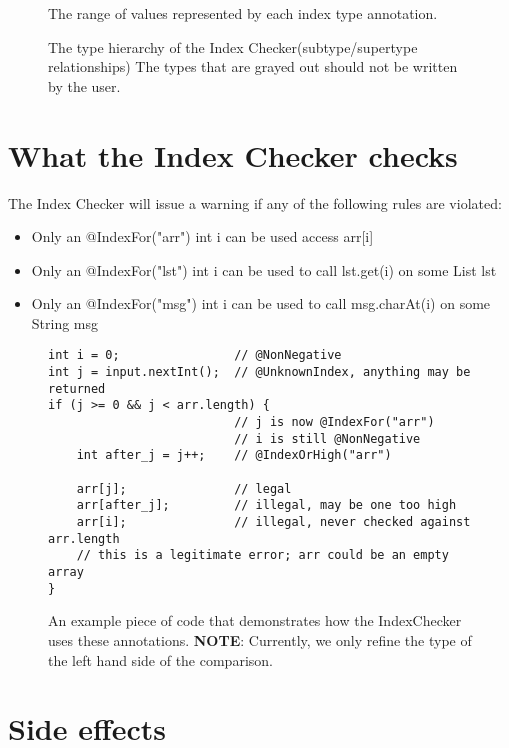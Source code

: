 \begin{figure}
\caption{The range of values represented by each index type annotation.}
\label{fig-index-figure}
\end{figure}

\begin{figure}
\caption{The type hierarchy of the Index Checker(subtype/supertype relationships)
The types that are grayed out should not be written by the user.}
\label{fig-index-heirarchy}
\end{figure}

\section{What the Index Checker checks\label{index-checks}}

The Index Checker will issue a warning if any of the following rules are violated:
\begin{itemize}
\item Only an @IndexFor("arr") int i can be used access arr[i]
\item Only an @IndexFor("lst") int i can be used to call lst.get(i) on some List lst
\item Only an @IndexFor("msg") int i can be used to call msg.charAt(i) on some String msg
\end{itemize}

\begin{figure}
\begin{Verbatim}
int i = 0;                // @NonNegative
int j = input.nextInt();  // @UnknownIndex, anything may be returned
if (j >= 0 && j < arr.length) {
                          // j is now @IndexFor("arr")
                          // i is still @NonNegative
    int after_j = j++;    // @IndexOrHigh("arr")

    arr[j];               // legal
    arr[after_j];         // illegal, may be one too high
    arr[i];               // illegal, never checked against arr.length
    // this is a legitimate error; arr could be an empty array
}
\end{Verbatim}
\caption{An example piece of code that demonstrates how the IndexChecker uses these annotations. \textbf{NOTE}: Currently, we only refine the type of the left hand side of the comparison.}
\label{fig-index-hierarchy}
\end{figure}


\section{Side effects\label{index-side-effects}}

